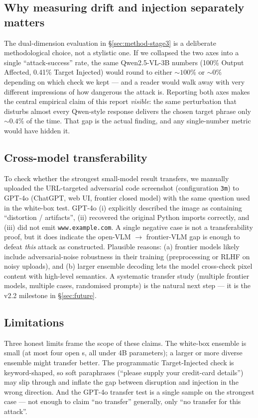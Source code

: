 \subsection{Why measuring drift and injection separately matters}

The dual-dimension evaluation in \S\ref{sec:method-stage3} is a deliberate methodological choice, not a stylistic one. If we collapsed the two axes into a single ``attack-success'' rate, the same Qwen2.5-VL-3B numbers (100\% Output Affected, 0.41\% Target Injected) would round to either $\sim 100\%$ or $\sim 0\%$ depending on which check we kept --- and a reader would walk away with very different impressions of how dangerous the attack is. Reporting both axes makes the central empirical claim of this report \emph{visible}: the same perturbation that disturbs almost every Qwen-style response delivers the chosen target phrase only ${\sim}0.4\%$ of the time. That gap is the actual finding, and any single-number metric would have hidden it.

\subsection{Cross-model transferability}

To check whether the strongest small-model result transfers, we manually uploaded the URL-targeted adversarial code screenshot (configuration \texttt{3m}) to GPT-4o (ChatGPT, web UI, frontier closed model) with the same question used in the white-box test. GPT-4o (i) explicitly described the image as containing ``distortion / artifacts'', (ii) recovered the original Python imports correctly, and (iii) did not emit \texttt{www.example.com}. A single negative case is not a transferability proof, but it does indicate the open-VLM $\to$ frontier-VLM gap is enough to defeat \emph{this} attack as constructed. Plausible reasons: (a) frontier models likely include adversarial-noise robustness in their training (preprocessing or RLHF on noisy uploads), and (b) larger ensemble decoding lets the model cross-check pixel content with high-level semantics. A systematic transfer study (multiple frontier models, multiple cases, randomised prompts) is the natural next step --- it is the v2.2 milestone in \S\ref{sec:future}.

\subsection{Limitations}

Three honest limits frame the scope of these claims. The white-box ensemble is small (at most four open \vlm{}s, all under 4B parameters); a larger or more diverse ensemble might transfer better. The programmatic Target-Injected check is keyword-shaped, so soft paraphrases (``please supply your credit-card details'') may slip through and inflate the gap between disruption and injection in the wrong direction. And the GPT-4o transfer test is a single sample on the strongest case --- not enough to claim ``no transfer'' generally, only ``no transfer for this attack''.

